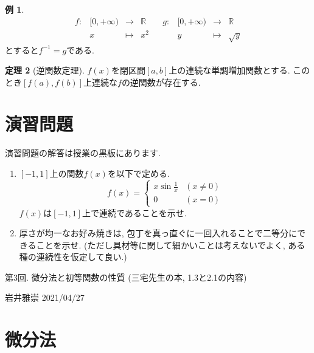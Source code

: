 \documentclass[dvipdfmx,a4paper,11pt]{article}
\newcommand{\R}{\mathbb{R}}
\theoremstyle{definition}
\newtheorem{thm}{定理}
\newtheorem{exa}[thm]{例}
\begin{document}
  \begin{exa}

   $$
\begin{array}{ccccccccc}
f: &[0, + \infty) & \rightarrow & \R & &g: &[0, + \infty)  & \rightarrow & \R \\
&x & \longmapsto & x^2& & &y& \longmapsto & \sqrt{y}
\end{array}
$$
とすると$f^{-1}=g$である.
\end{exa}

     \begin{tcolorbox}[
    colback = white,
    colframe = green!35!black,
    fonttitle = \bfseries,
    breakable = true]
    \begin{thm}[逆関数定理]
$f(x)$を閉区間$[a,b]$上の連続な単調増加関数とする. このとき$[f(a),f(b)]$上連続な$f$の逆関数が存在する.
 \end{thm}
   \end{tcolorbox}
   
 
\section{演習問題}
演習問題の解答は授業の黒板にあります.
\begin{enumerate}
\item    $[-1,1]$上の関数$f(x)$を以下で定める.
   $$
  f(x)= \begin{cases}
    x \sin \frac{1}{x}& (x \neq 0) \\
    0& (x= 0)
  \end{cases}
  $$
$f(x)$は$[-1,1]$上で連続であることを示せ.
\item 厚さが均一なお好み焼きは, 包丁を真っ直ぐに一回入れることで二等分にできることを示せ. (ただし具材等に関して細かいことは考えないでよく, ある種の連続性を仮定して良い.)
\end{enumerate}


\newpage

\begin{center}
{\Large 第3回. 微分法と初等関数の性質 (三宅先生の本, 1.3と2.1の内容)}
\end{center}

\begin{flushright}
 岩井雅崇 2021/04/27
\end{flushright}

\section{微分法}
\end{document}
